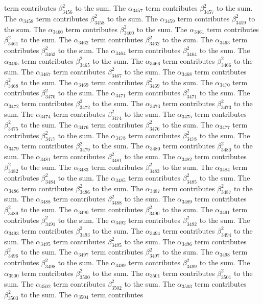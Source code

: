 \begin{lemma}
term contributes $\beta_{3456}^{2}$ to the sum. The $\alpha_{3457}$ term contributes $\beta_{3457}^{2}$ to the sum. The $\alpha_{3458}$ term contributes $\beta_{3458}^{2}$ to the sum. The $\alpha_{3459}$ term contributes $\beta_{3459}^{2}$ to the sum. The $\alpha_{3460}$ term contributes $\beta_{3460}^{2}$ to the sum. The $\alpha_{3461}$ term contributes $\beta_{3461}^{2}$ to the sum. The $\alpha_{3462}$ term contributes $\beta_{3462}^{2}$ to the sum. The $\alpha_{3463}$ term contributes $\beta_{3463}^{2}$ to the sum. The $\alpha_{3464}$ term contributes $\beta_{3464}^{2}$ to the sum. The $\alpha_{3465}$ term contributes $\beta_{3465}^{2}$ to the sum. The $\alpha_{3466}$ term contributes $\beta_{3466}^{2}$ to the sum. The $\alpha_{3467}$ term contributes $\beta_{3467}^{2}$ to the sum. The $\alpha_{3468}$ term contributes $\beta_{3468}^{2}$ to the sum. The $\alpha_{3469}$ term contributes $\beta_{3469}^{2}$ to the sum. The $\alpha_{3470}$ term contributes $\beta_{3470}^{2}$ to the sum. The $\alpha_{3471}$ term contributes $\beta_{3471}^{2}$ to the sum. The $\alpha_{3472}$ term contributes $\beta_{3472}^{2}$ to the sum. The $\alpha_{3473}$ term contributes $\beta_{3473}^{2}$ to the sum. The $\alpha_{3474}$ term contributes $\beta_{3474}^{2}$ to the sum. The $\alpha_{3475}$ term contributes $\beta_{3475}^{2}$ to the sum. The $\alpha_{3476}$ term contributes $\beta_{3476}^{2}$ to the sum. The $\alpha_{3477}$ term contributes $\beta_{3477}^{2}$ to the sum. The $\alpha_{3478}$ term contributes $\beta_{3478}^{2}$ to the sum. The $\alpha_{3479}$ term contributes $\beta_{3479}^{2}$ to the sum. The $\alpha_{3480}$ term contributes $\beta_{3480}^{2}$ to the sum. The $\alpha_{3481}$ term contributes $\beta_{3481}^{2}$ to the sum. The $\alpha_{3482}$ term contributes $\beta_{3482}^{2}$ to the sum. The $\alpha_{3483}$ term contributes $\beta_{3483}^{2}$ to the sum. The $\alpha_{3484}$ term contributes $\beta_{3484}^{2}$ to the sum. The $\alpha_{3485}$ term contributes $\beta_{3485}^{2}$ to the sum. The $\alpha_{3486}$ term contributes $\beta_{3486}^{2}$ to the sum. The $\alpha_{3487}$ term contributes $\beta_{3487}^{2}$ to the sum. The $\alpha_{3488}$ term contributes $\beta_{3488}^{2}$ to the sum. The $\alpha_{3489}$ term contributes $\beta_{3489}^{2}$ to the sum. The $\alpha_{3490}$ term contributes $\beta_{3490}^{2}$ to the sum. The $\alpha_{3491}$ term contributes $\beta_{3491}^{2}$ to the sum. The $\alpha_{3492}$ term contributes $\beta_{3492}^{2}$ to the sum. The $\alpha_{3493}$ term contributes $\beta_{3493}^{2}$ to the sum. The $\alpha_{3494}$ term contributes $\beta_{3494}^{2}$ to the sum. The $\alpha_{3495}$ term contributes $\beta_{3495}^{2}$ to the sum. The $\alpha_{3496}$ term contributes $\beta_{3496}^{2}$ to the sum. The $\alpha_{3497}$ term contributes $\beta_{3497}^{2}$ to the sum. The $\alpha_{3498}$ term contributes $\beta_{3498}^{2}$ to the sum. The $\alpha_{3499}$ term contributes $\beta_{3499}^{2}$ to the sum. The $\alpha_{3500}$ term contributes $\beta_{3500}^{2}$ to the sum. The $\alpha_{3501}$ term contributes $\beta_{3501}^{2}$ to the sum. The $\alpha_{3502}$ term contributes $\beta_{3502}^{2}$ to the sum. The $\alpha_{3503}$ term contributes $\beta_{3503}^{2}$ to the sum. The $\alpha_{3504}$ term contributes 
\end{lemma}

